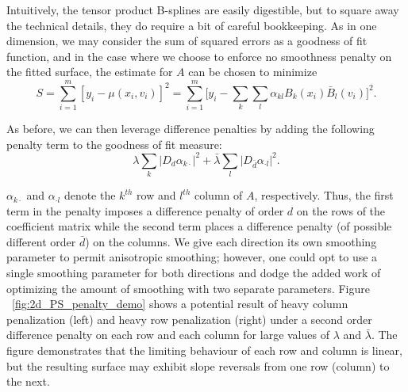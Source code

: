 \documentclass[12pt]{article}
\theoremstyle{definition}
\begin{document}
Intuitively, the tensor product B-splines are easily digestible, but to square away the technical details, they do require a bit of careful bookkeeping. As in one dimension, we may consider the sum of squared errors as a goodness of fit function, and in the case where we choose to enforce no smoothness penalty on the fitted surface, the estimate for $A$ can be chosen to minimize 
\begin{equation} \label{eq:S_2D_intecept_only_model}
S = \sum_{i=1}^m \left[ y_i  - \mu\left(x_i,v_i\right) \right]^2 = \sum_{i=1}^m \bigg[ y_i  - \sum_{k}\sum_{l} \alpha_{kl}B_k\left(x_i\right)\bar{B}_l\left(v_i\right) \bigg]^2.
\end{equation}

As before, we can then leverage difference penalties by adding the following penalty term to the goodness of fit measure:
\begin{equation} \label{eq:unvectorized_2D_penalty}
\lambda \sum_{k} \vert D_d \alpha_{k \cdot} \vert^2 + \bar{\lambda} \sum_{l} \vert D_{\bar{d}} \alpha_{\cdot l} \vert^2 .
\end{equation}

$\alpha_{k \cdot}$ and $\alpha_{\cdot l}$ denote the $k^{th}$ row and $l^{th}$ column of $A$, respectively. Thus, the first term in the penalty imposes a difference penalty of order $d$ on the rows of the coefficient matrix while the second term places a difference penalty (of possible different order $\bar{d}$) on the columns. We give each direction its own smoothing parameter to permit anisotropic smoothing; however, one could opt to use a single smoothing parameter for both directions and dodge the added work of optimizing the amount of smoothing with two separate parameters. Figure ~\ref{fig:2d_PS_penalty_demo} shows a potential result of heavy column penalization (left) and heavy row penalization (right) under a second order difference penalty on each row and each column for large values of $\lambda$ and $\bar{\lambda}$. The figure demonstrates that the limiting behaviour of each row and column is linear, but the resulting surface may exhibit slope reversals from one row (column) to the next. 
\end{document}
